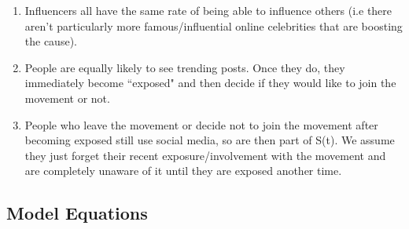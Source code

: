 \documentclass{article}
\begin{document}
\begin{enumerate}
    \item Influencers all have the same rate of being able to influence others (i.e there aren’t particularly more famous/influential online celebrities that are boosting the cause). 

    \item People are equally likely to see trending posts. Once they do, they immediately become ``exposed" and then decide if they would like to join the movement or not. 
    
    \item People who leave the movement or decide not to join the movement after becoming exposed still use social media, so are then part of S(t). We assume they just forget their recent exposure/involvement with the movement and are completely unaware of it until they are exposed another time. 
    \end{enumerate}
    \subsection{Model Equations}
\end{document}
